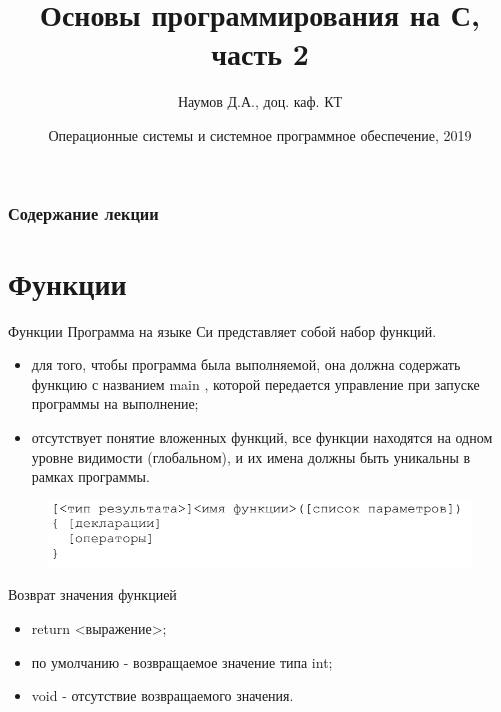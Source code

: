 \documentclass{beamer}
\title[Язык C]{Основы программирования на С, часть 2}
\author{Наумов Д.А., доц. каф. КТ}
\date[12.09.2019] {Операционные системы и системное программное обеспечение, 2019}
\begin{document}
\begin{frame}
  \titlepage
\end{frame}
  
\begin{frame}
  \frametitle{Содержание лекции}
  \tableofcontents  
\end{frame}

\section{Функции}
\begin{frame}{Функции}
Программа на языке Си представляет собой набор функций.
\begin{itemize}
\item для того, чтобы программа была выполняемой, она должна содержать функцию с названием  main , которой передается управление при запуске программы на выполнение;
\item отсутствует понятие вложенных функций, все функции находятся на одном уровне видимости (глобальном), и их имена должны быть уникальны в рамках программы.
\end{itemize}
\begin{figure}[h]
\centering
\includegraphics[scale=0.5]{images/lec03-pic01.png}
\end{figure}
Возврат значения функцией 
\begin{itemize}
\item return <выражение>;
\item по умолчанию - возвращаемое значение типа int;
\item void - отсутствие возвращаемого значения.
\end{itemize}
\end{frame}
\end{document}
